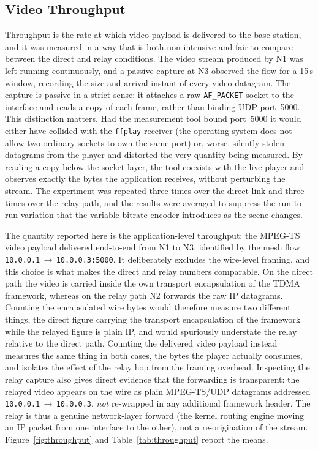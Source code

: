 \subsection{Video Throughput}
\label{subsec:res-throughput}

Throughput is the rate at which video payload is delivered to the base
station, and it was measured in a way that is both non-intrusive and fair to
compare between the direct and relay conditions. The video stream produced by
N1 was left running continuously, and a passive capture at N3 observed the
flow for a 15\,s window, recording the size and arrival instant of every video
datagram. The capture is passive in a strict sense: it attaches a raw
\texttt{AF\_PACKET} socket to the interface and reads a copy of each frame,
rather than binding UDP port~5000. This distinction matters. Had the
measurement tool bound port~5000 it would either have collided with the
\texttt{ffplay} receiver (the operating system does not allow two ordinary
sockets to own the same port) or, worse, silently stolen datagrams from the
player and distorted the very quantity being measured. By reading a copy below
the socket layer, the tool coexists with the live player and observes exactly
the bytes the application receives, without perturbing the stream. The
experiment was repeated three times over the direct link and three times over
the relay path, and the results were averaged to suppress the run-to-run
variation that the variable-bitrate encoder introduces as the scene changes.

The quantity reported here is the application-level throughput: the
MPEG-TS video payload delivered end-to-end from N1 to N3, identified by the
mesh flow \texttt{10.0.0.1}\,$\to$\,\texttt{10.0.0.3:5000}. It deliberately
excludes the wire-level framing, and this choice is what makes the direct and
relay numbers comparable. On the direct path the video is carried inside the
own transport encapsulation of the TDMA framework, whereas on the relay path N2
forwards the raw IP datagrams. Counting the encapsulated wire bytes would
therefore measure two different things, the direct figure carrying the
transport encapsulation of the framework while the relayed figure is plain IP, and
would spuriously understate the relay relative to the direct path. Counting the
delivered video payload instead measures
the same thing in both cases, the bytes the player actually consumes, and
isolates the effect of the relay hop from the framing overhead. Inspecting the relay capture also gives direct evidence that the
forwarding is transparent: the relayed video appears on the wire as plain
MPEG-TS/UDP datagrams addressed \texttt{10.0.0.1}\,$\to$\,\texttt{10.0.0.3},
\emph{not} re-wrapped in any additional framework header. The relay is thus a
genuine network-layer forward (the kernel routing engine moving an IP packet
from one interface to the other), not a re-origination of the stream.
Figure~\ref{fig:throughput} and Table~\ref{tab:throughput} report the means.

